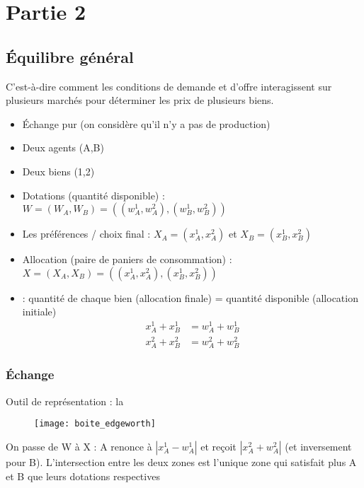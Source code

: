\chapter{Partie 2}

\section{Équilibre général}

 C'est-à-dire comment les conditions de demande et d'offre interagissent sur plusieurs marchés pour déterminer les prix de plusieurs biens.
\begin{itemize}
\item Échange pur (on considère qu'il n'y a pas de production)
\item Deux agents (A,B)
\item Deux biens (1,2)
\item Dotations (quantité disponible) : $W = (W_A, W_B) = ((w_A^1, w_A^2), (w_B^1,w_B^2))$
\item Les préférences / choix final : $X_A = (x_A^1, x_A^2)$ et $X_B = (x_B^1,x_B^2)$
\item Allocation (paire de paniers de consommation) : $X = (X_A, X_B) = ((x_A^1, x_A^2), (x_B^1,x_B^2))$
\item {} : quantité de chaque bien (allocation finale) = quantité disponible (allocation initiale)
\begin{align*}
x_A^1 + x_B^1 &= w_A^1 + w_B^1\\
x_A^2 + x_B^2 &= w_A^2 + w_B^2
\end{align*}
\end{itemize}

\subsection{Échange}

Outil de représentation : la 
\begin{figure}[H]
	\centering
	\texttt{[image: boite\_edgeworth]}
\end{figure}

On passe de W à X : A renonce à $|x_A^1 - w_A^1|$ et reçoit $|x_A^2 + w_A^2|$ (et inversement pour B). L'intersection entre les deux zones est l'unique zone qui satisfait plus A et B que leurs dotations respectives

